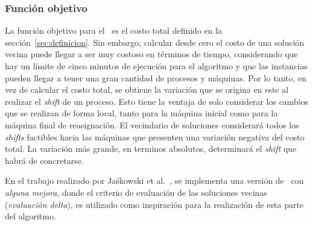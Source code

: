 \documentclass[../informe2.tex]{subfiles}
\begin{document}
\subsubsection{Función objetivo}
\label{subs:hill-climbing-funcion-objetivo}
La función objetivo para el \mrp\ es el costo total definido en la sección~\ref{sec:definicion}. Sin embargo, calcular desde cero el costo de una solución vecina puede llegar a ser muy costoso en términos de tiempo, considerando que hay un límite de cinco minutos de ejecución para el algoritmo y que las instancias pueden llegar a tener una gran cantidad de procesos y máquinas. Por lo tanto, en vez de calcular el costo total, se obtiene la variación que se origina en este al realizar el \textit{shift} de un proceso. Esto tiene la ventaja de solo considerar los cambios que se realizan de forma local, tanto para la máquina inicial como para la máquina final de reasignación. El vecindario de soluciones considerará todos los \textit{shifts} factibles hacia las máquinas que presenten una variación negativa del costo total. La variación más grande, en terminos absolutos, determinará el \textit{shift} que habrá de concretarse. \par
\noindent En el trabajo realizado por Jaśkowski et al.~\cite{jaskowskihybrid}, se implementa una versión de \hillc\ con \textit{alguna mejora}, donde el criterio de evaluación de las soluciones vecinas (\textit{evaluación delta}), es utilizado como inspiración para la realización de esta parte del algoritmo.
\end{document}
